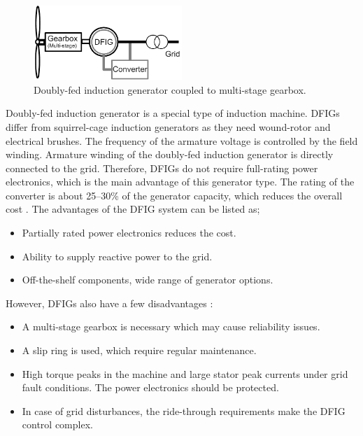 \documentclass[a4paper, 11pt]{article} %
\begin{document}
  \begin{figure}[h]
    \centering
    \includegraphics[width=0.5\textwidth]{DFIG_3G}
    \caption{Doubly-fed induction generator coupled to multi-stage gearbox.} 
    \label{dfig_3g}
  \end{figure}

Doubly-fed induction generator is a special type of induction machine. DFIGs differ from squirrel-cage induction generators as they need wound-rotor and electrical brushes. The frequency of the armature voltage is controlled by the field winding. Armature winding of the doubly-fed induction generator is directly connected to the grid. Therefore, DFIGs do not require full-rating power electronics, which is the main advantage of this generator type. The rating of the converter is about 25--30\% of the generator capacity, which reduces the overall cost \cite{Li2008a}.
The advantages of the DFIG system can be listed as;

\begin{itemize}
	\item Partially rated power electronics reduces the cost.
	\item Ability to supply reactive power to the grid.
	\item Off-the-shelf components, wide range of generator options.
\end{itemize}

However, DFIGs also have a few disadvantages \cite{Li2008a}:

\begin{itemize}
	\item A multi-stage gearbox is necessary which may cause reliability issues.
	\item A slip ring is used, which require regular maintenance.
	\item High torque peaks in the machine and large stator peak currents under grid fault conditions. The power electronics should be protected.
	\item In case of grid disturbances, the ride-through requirements make the DFIG control complex.
\end{itemize}
\end{document}
